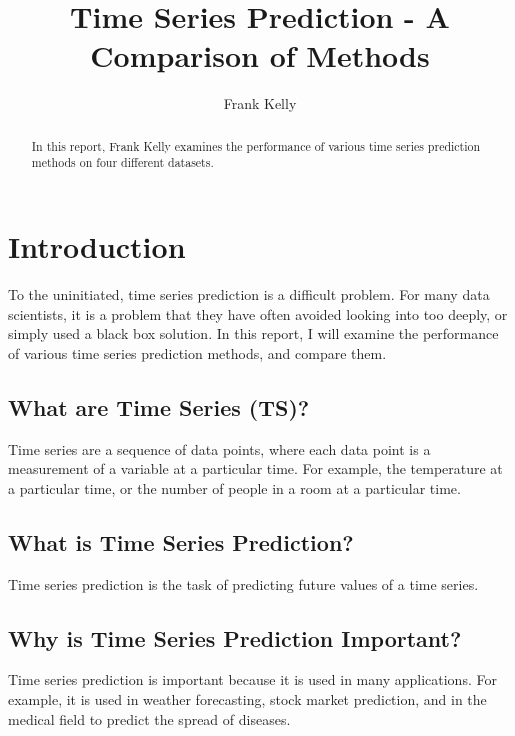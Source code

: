 \documentclass[manuscript,screen,nonacm,11pt]{acmart}
\numberwithin{equation}{section}
\begin{document}
\title{Time Series Prediction - A Comparison of Methods}

\author{Frank Kelly}




\begin{abstract}
\begin{shaded}
In this report, Frank Kelly examines the performance of various time series prediction methods on four different datasets.
\end{shaded}
\end{abstract}



\maketitle
\pagestyle{plain}

\section{Introduction}
\label{sec:intro}
To the uninitiated, time series prediction is a difficult problem.
For many data scientists, it is a problem that they have often
avoided looking into too deeply, or simply used a black box solution.
In this report, I will examine the performance of various
time series prediction methods, and compare them.
\subsection{What are Time Series (TS)?}
Time series are a sequence of data points, where each data point
is a measurement of a variable at a particular time.
For example, the temperature at a particular time, or the number of
people in a room at a particular time.
\subsection{What is Time Series Prediction?}
Time series prediction is the task of predicting future values of a time series.
\subsection{Why is Time Series Prediction Important?}
Time series prediction is important because it is used in many applications.
For example, it is used in weather forecasting, stock market prediction,
and in the medical field to predict the spread of diseases.
\end{document}
